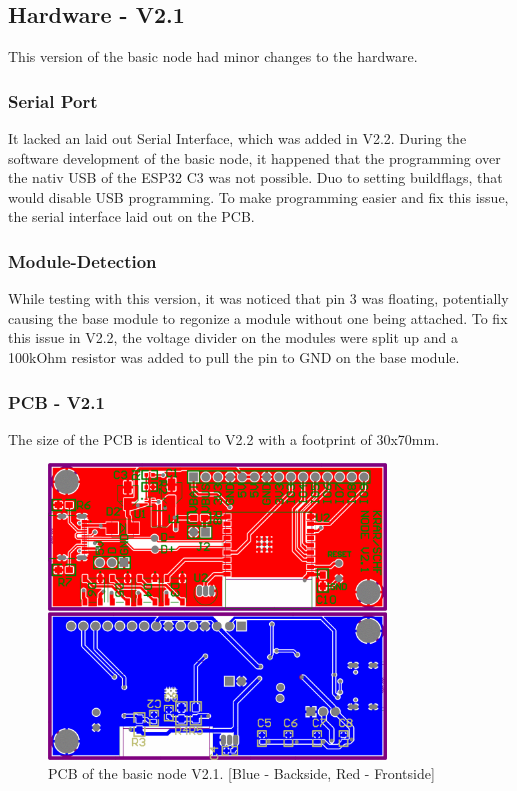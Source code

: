 \subsection{Hardware - V2.1}

    This version of the basic node had minor changes to the hardware. 

    \subsubsection{Serial Port}

        It lacked an laid out Serial Interface, which was added in V2.2.
        During the software development of the basic node, it happened that the 
        programming over the nativ USB of the ESP32 C3 was not possible. Duo to 
        setting buildflags, that would disable USB programming. To make programming
        easier and fix this issue, the serial interface laid out on the PCB. 


    \subsubsection{Module-Detection}
        While testing with this version, it was noticed that pin 3 was floating,
        potentially causing the base module to regonize a module without one being attached.
        To fix this issue in V2.2, the voltage divider on the modules were split up and
        a 100kOhm resistor was added to pull the pin to GND on the base module.
        
    \subsubsection{PCB - V2.1}
        The size of the PCB is identical to V2.2 with a footprint of 30x70mm. 

    \begin{figure}[H]
        \centering
        \includegraphics[width=0.8\textwidth]{assets/HW/PCB-NODE-V2.1.png}
        \caption{PCB of the basic node V2.1. [Blue - Backside, Red - Frontside]}
    \end{figure}


